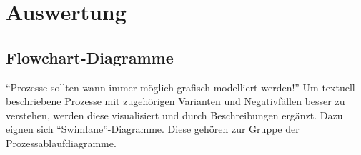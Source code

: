 \chapter{Auswertung}\label{ch:auswertung}

\begin{landscape}
    \section{Flowchart-Diagramme}\label{sec:flowchart-diagramme}
    \enquote{Prozesse sollten wann immer möglich grafisch modelliert werden!}
    Um textuell beschriebene Prozesse mit zugehörigen Varianten und Negativfällen besser zu verstehen, werden diese visualisiert und durch Beschreibungen ergänzt.
    Dazu eignen sich \enquote{Swimlane}-Diagramme.
    Diese gehören zur Gruppe der Prozessablaufdiagramme.
\end{landscape}
